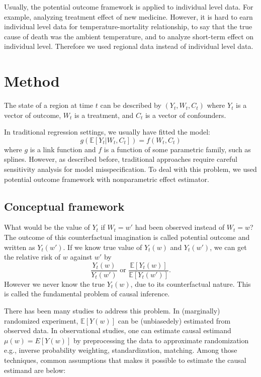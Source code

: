 \documentclass[12pt]{article}
\begin{document}
Usually, the potential outcome framework is applied to individual level data. 
For example, analyzing treatment effect of new medicine. 
However, it is hard to earn individual level data for temperature-mortality relationship,
to say that the true cause of death was the ambient temperature, 
and to analyze short-term effect on individual level. 
Therefore we used regional data instead of individual level data.

\section{Method}

The state of a region at time $t$ can be described by $(Y_t, W_t, C_t)$ 
where $Y_t$ is a vector of outcome, $W_t$ is a treatment, and $C_t$ is a vector of confounders.

In traditional regression settings, we usually have fitted the model:
\[
	g\left( \mathbb{E}\left[ Y_t \lvert W_t, C_t \right] \right) = f(W_t, C_t)
\]
where $g$ is a link function and $f$ is a function of some parametric family, such as splines.
However, as described before, traditional approaches require careful sensitivity analysis for model misspecification.
To deal with this problem, we used potential outcome framework with nonparametric effect estimator.

\subsection{Conceptual framework}

What would be the value of $Y_t$ if $W_t = w'$ had been observed instead of $W_t = w$?
The outcome of this counterfactual imagination is called potential outcome and written as $Y_t(w')$.
If we know true value of $Y_t(w)$ and $Y_t(w')$, we can get the relative risk of $w$ against $w'$ by
\[
	\frac{Y_t(w)}{Y_t(w')} \text{ or } 
	\frac{\mathbb{E}\left[ Y_t(w) \right]}{\mathbb{E}\left[ Y_t(w') \right]}.
\]
However we never know the true $Y_t(w)$, due to its counterfactual nature.
This is called the fundamental problem of causal inference.\cite{holland1986}

There has been many studies to address this problem.
In (marginally) randomized experiment, 
$\mathbb{E}[Y(w)]$ can be (unbiasedely) estimated from observed data.\cite{rubin1974}
In observational studies, 
one can estimate causal estimand $\mu(w) = E[Y(w)]$ by preprocessing the data to approximate randomization 
e.g., inverse probability weighting, standardization, matching.\cite{rosenbaum1983}
Among those techniques, 
common assumptions that makes it possible to estimate the causal estimand are below:
\end{document}
